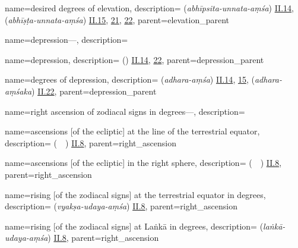 {
        name={desired degrees of elevation},
        description={ (\textit{abhīpsita-unnata-aṃśa}) \hyperlink{Sii14}{II.14},
          (\textit{abhīṣṭa-unnata-aṃśa}) \hyperlink{Sii15}{II.15}, \hyperlink{Sii21}{21}, \hyperlink{Sii22}{22}},
        parent={elevation_parent}
}

{
        name={depression---},
        description={\phantom{x}\nopagebreak}
}

{
        name={depression},
        description={ (\inkhifad) \hyperlink{Pii14}{II.14}, \hyperlink{Pii22}{22}},
        parent={depression_parent}
}

{
        name={degrees of depression},
        description={ (\textit{adhara-aṃśa}) \hyperlink{Sii14}{II.14}, \hyperlink{Sii15}{15},  (\textit{adhara-aṃśaka}) \hyperlink{Sii22}{II.22}},
        parent={depression_parent}
}

{
        name={right ascension of zodiacal signs in degrees---},
        description={\phantom{x}\nopagebreak}
}

{
        name={ascensions [of the ecliptic] at the line of the terrestrial equator},
        description={\newline {} (\matali\ \khatt\idafaconsonant\ \istiva)
        \hyperlink{Pii8}{II.8}},
        parent={right_ascension}
}

{
        name={ascensions [of the ecliptic] in the right sphere},
        description={ (\matali\ \falak\idafaconsonant\ \mustaqim) \hyperlink{Pii8}{II.8}},
        parent={right_ascension}
}

{
        name={rising [of the zodiacal signs] at the terrestrial equator in degrees},
        description={ (\textit{vyakṣa-udaya-aṃśa}) \hyperlink{Sii8}{II.8}},
        parent={right_ascension}
}

{
        name={rising [of the zodiacal signs] at Laṅkā in degrees},
        description={ (\textit{laṅkā-udaya-aṃśa}) \hyperlink{Sii8}{II.8}},
        parent={right_ascension}
}

